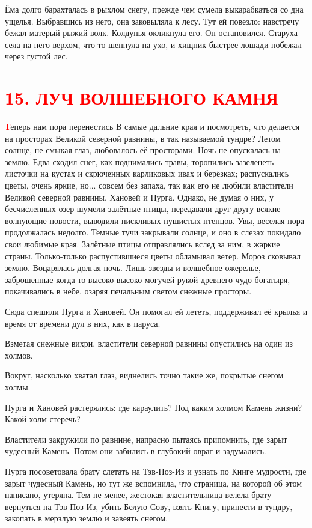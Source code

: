 \documentclass[12pt, a4paper, openany]{book}
\begin{document}
	Ёма долго барахталась в рыхлом снегу, прежде чем сумела выкарабкаться со дна ущелья. Выбравшись из него, она заковыляла к лесу. Тут ей повезло: навстречу бежал матерый рыжий волк. Колдунья окликнула его. Он остановился. Старуха села на него верхом, что-то шепнула на ухо, и хищник быстрее лошади побежал через густой лес.
	
				\section[15. Луч волшебного камня]{\center \textcolor{red}{15. ЛУЧ ВОЛШЕБНОГО КАМНЯ}}
	

	\lettrine[findent=0pt]{\textbf{\textcolor{red}{Т}}}{}еперь нам пора перенестись В самые дальние края и посмотреть, что делается на просторах Великой северной равнины, в так называемой тундре? Летом солнце, не смыкая глаз, любовалось её просторами. Ночь не опускалась на землю. Едва сходил снег, как поднимались травы, торопились зазеленеть листочки на кустах и скрюченных карликовых ивах и берёзках; распускались цветы, очень яркие, но... совсем без запаха, так как его не любили властители Великой северной равнины, Хановей и Пурга. Однако, не думая о них, у бесчисленных озер шумели залётные птицы, передавали друг другу всякие волнующие новости, выводили пискливых пушистых птенцов. Увы, веселая пора продолжалась недолго. Темные тучи закрывали солнце, и оно в слезах покидало свои любимые края. Залётные птицы отправлялись вслед за ним, в жаркие страны. Только-только распустившиеся цветы обламывал ветер. Мороз сковывал землю. Воцарялась долгая ночь. Лишь звезды и волшебное ожерелье, заброшенные когда-то высоко-высоко могучей рукой древнего чудо-богатыря, покачивались в небе, озаряя печальным светом снежные просторы.
	
	Сюда спешили Пурга и Хановей. Он помогал ей лететь, поддерживал её крылья и время от времени дул в них, как в паруса.
	
	Взметая снежные вихри, властители северной равнины опустились на один из холмов.
	
	Вокруг, насколько хватал глаз, виднелись точно такие же, покрытые снегом холмы.
	
	Пурга и Хановей растерялись: где караулить? Под каким холмом Камень жизни? Какой холм стеречь?
	
	Властители закружили по равнине, напрасно пытаясь припомнить, где зарыт чудесный Камень. Потом они забились в глубокий овраг и задумались.
	
	Пурга посоветовала брату слетать на Тэв-Поз-Из и узнать по Книге мудрости, где зарыт чудесный Камень, но тут же вспомнила, что страница, на которой об этом написано, утеряна. Тем не менее, жестокая властительница велела брату вернуться на Тэв-Поз-Из, убить Белую Сову, взять Книгу, принести в тундру, закопать в мерзлую землю и завеять снегом.
	
\end{document}
